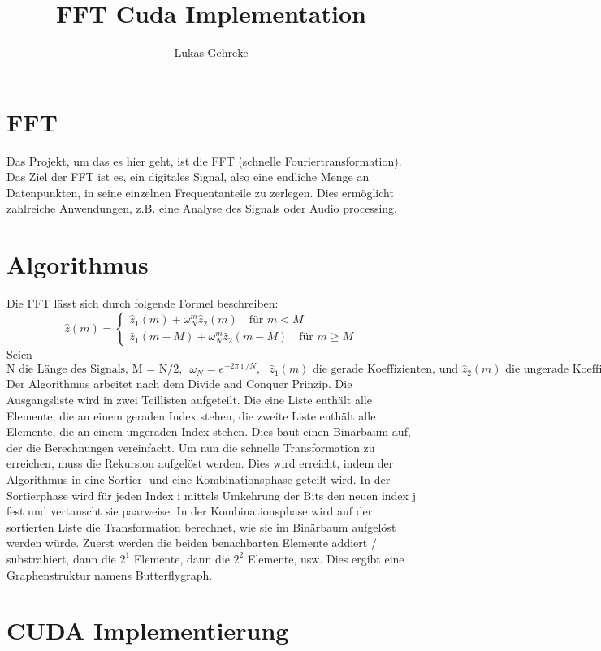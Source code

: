 \documentclass[sigconf]{acmart}
\begin{document}
\title{FFT Cuda Implementation}
\author{Lukas Gehreke}

\renewcommand{\shortauthors}{Gehreke}

\section{FFT}
Das Projekt, um das es hier geht, ist die FFT (schnelle Fouriertransformation). Das Ziel der FFT ist es, ein digitales Signal, also eine endliche Menge an Datenpunkten, in seine einzelnen Frequentanteile zu zerlegen. Dies ermöglicht zahlreiche Anwendungen, z.B. eine Analyse des Signals oder Audio processing.

\section{Algorithmus}
Die FFT lässt sich durch folgende Formel beschreiben:
\[\hat{z}(m) =
  \begin{cases}
    \hat{z}_1(m) + \omega_N^m \hat{z}_2(m) \quad \text{für } m < M\\
    \hat{z}_1(m - M) + \omega_N^m \hat{z}_2(m - M) \quad \text{für } m \geq M
  \end{cases}
\]
Seien $\text{N die Länge des Signals, M = N/2,} \text{ }\omega_N = e^{-2 \pi \imath / N},\text{ }\hat{z}_1(m) \text{ die gerade Koeffizienten, und }\hat{z}_2(m)  \text{ die ungerade Koeffizienten. }$Der Algorithmus arbeitet nach dem Divide and Conquer Prinzip. Die Ausgangsliste wird in zwei Teillisten aufgeteilt. Die eine Liste enthält alle Elemente, die an einem geraden Index stehen, die zweite Liste enthält alle Elemente, die an einem ungeraden Index stehen. Dies baut einen Binärbaum auf, der die Berechnungen vereinfacht. Um nun die schnelle Transformation zu erreichen, muss die Rekursion aufgelöst werden. Dies wird erreicht, indem der Algorithmus in eine Sortier- und eine Kombinationsphase geteilt wird. In der Sortierphase wird für jeden Index i mittels Umkehrung der Bits den neuen index j fest und vertauscht sie paarweise. In der Kombinationsphase wird auf der sortierten Liste die Transformation berechnet, wie sie im Binärbaum aufgelöst werden würde. Zuerst werden die beiden benachbarten Elemente addiert / substrahiert, dann die $2^1$ Elemente, dann die $2^2$ Elemente, usw. Dies ergibt eine Graphenstruktur namens Butterflygraph. 

\section{CUDA Implementierung}
\end{document}
